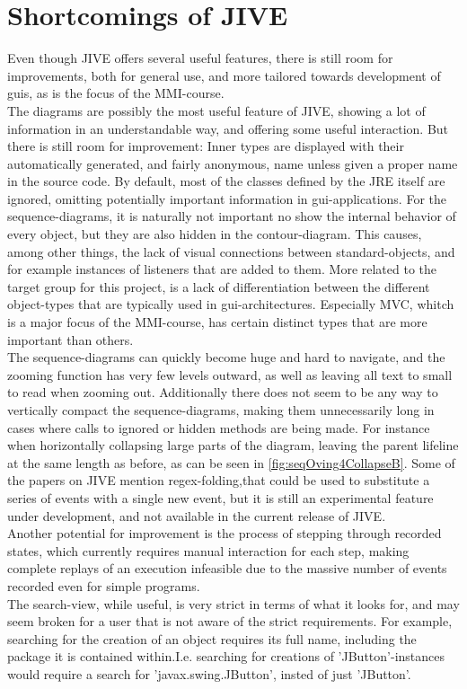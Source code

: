 \section{Shortcomings of JIVE}\label{jiveShortcomings}

Even though JIVE offers several useful features, there is still room for improvements, both for general use, and more tailored towards development of \gls{gui}s, as is the focus of the MMI-course.
~\\

The diagrams are possibly the most useful feature of JIVE, showing a lot of information in an understandable way, and offering some useful interaction.
But there is still room for improvement:
Inner types are displayed with their automatically generated, and fairly anonymous, name unless given a proper name in the source code.
By default, most of the classes defined by the JRE itself are ignored, omitting potentially important information in \gls{gui}-applications.
For the sequence-diagrams, it is naturally not important no show the internal behavior of every object, but they are also hidden in the contour-diagram.
This causes, among other things, the lack of visual connections between standard-objects, and for example instances of listeners that are added to them.
More related to the target group for this project, is a lack of differentiation between the different object-types that are typically used in \gls{gui}-architectures.
Especially MVC, whitch is a major focus of the MMI-course, has certain distinct types that are more important than others.
~\\

The sequence-diagrams can quickly become huge and hard to navigate, and the zooming function has very few levels outward, as well as leaving all text to small to read when zooming out.
Additionally there does not seem to be any way to vertically compact the sequence-diagrams, making them unnecessarily long in cases where calls to ignored or hidden methods are being made.
For instance when horizontally collapsing large parts of the diagram, leaving the parent lifeline at the same length as before, as can be seen in \autoref{fig:seqOving4CollapseB}.
Some of the papers on JIVE mention regex-folding,that could be used to substitute a series of events with a single new event, but it is still an experimental feature under development, and not available in the current release of JIVE.
~\\

Another potential for improvement is the process of stepping through recorded states, which currently requires manual interaction for each step, making complete replays of an execution infeasible due to the massive number of events recorded even for simple programs.
~\\

The search-view, while useful, is very strict in terms of what it looks for, and may seem broken for a user that is not aware of the strict requirements.
For example, searching for the creation of an object requires its full name, including the package it is contained within.I.e. searching for creations of 'JButton'-instances would require a search for 'javax.swing.JButton', insted of just 'JButton'.
~\\